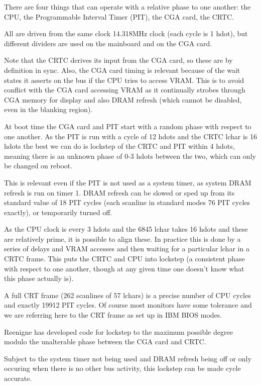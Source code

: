\documentclass[a4paper,10pt]{amsart}
\begin{document}
There are four things that can operate with a relative phase to one another:
the CPU, the Programmable Interval Timer (PIT), the CGA card, the CRTC.

All are driven from the same clock 14.318MHz clock (each cycle is 1 hdot), but
different dividers are used on the mainboard and on the CGA card.

Note that the CRTC derives its input from the CGA card, so these are by
definition in sync. Also, the CGA card timing is relevant because of the wait
states it asserts on the bus if the CPU tries to access VRAM. This is to avoid
conflict with the CGA card accessing VRAM as it continually strobes through CGA
memory for display and also DRAM refresh (which cannot be disabled, even in the
blanking region).

At boot time the CGA card and PIT start with a random phase with respect to
one another. As the PIT is run with a cycle of 12 hdots and the CRTC lchar is
16 hdots the best we can do is lockstep of the CRTC and PIT within 4 hdots,
meaning there is an unknown phase of 0-3 hdots between the two, which can only
be changed on reboot.

This is relevant even if the PIT is not used as a system timer, as system DRAM
refresh is run on timer 1. DRAM refresh can be slowed or sped up from its
standard value of 18 PIT cycles (each scanline in standard modes 76 PIT
cycles exactly), or temporarily turned off.

As the CPU clock is every 3 hdots and the 6845 lchar takes 16 hdots and these
are relatively prime, it is possible to align these. In practice this is done
by a series of delays and VRAM accesses and then waiting for a particular
lchar in a CRTC frame. This puts the CRTC and CPU into lockstep (a consistent
phase with respect to one another, though at any given time one doesn't know
what this phase actually is).

A full CRT frame (262 scanlines of 57 lchars) is a precise number of CPU cycles
and exactly 19912 PIT cycles. Of course most monitors have some tolerance and
we are referring here to the CRT frame as set up in IBM BIOS modes.

Reenigne has developed code for lockstep to the maximum possible degree modulo
the unalterable phase between the CGA card and CRTC.

Subject to the system timer not being used and DRAM refresh being off or only
occuring when there is no other bus activity, this lockstep can be made cycle
accurate.
\end{document}
